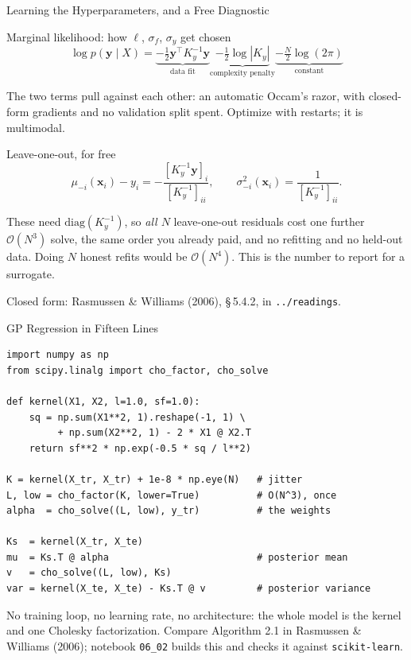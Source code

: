 \documentclass[aspectratio=169,11pt]{beamer}
\newcommand{\emphc}[1]{\textcolor{harvardcrimson}{#1}}
\newcommand{\x}{\bm{x}}
\begin{document}
\begin{frame}{Learning the Hyperparameters, and a Free Diagnostic}
\small
\begin{block}{Marginal likelihood: how $\ell$, $\sigma_f$, $\sigma_y$ get chosen}
\vspace{-6pt}
\[
\log p(\bm y \mid X) =
\underbrace{-\tfrac{1}{2}\bm y^\top K_y^{-1} \bm y}_{\text{data fit}}
\underbrace{-\tfrac{1}{2}\log|K_y|}_{\text{complexity penalty}}
\underbrace{-\tfrac{N}{2}\log(2\pi)}_{\text{constant}}
\]
\vspace{-8pt}

The two terms pull against each other: \emphc{an automatic Occam's razor}, with closed-form gradients and no validation split spent. Optimize with restarts; it is multimodal.
\end{block}

\vspace{0.08cm}
\begin{block}{Leave-one-out, for free}
\vspace{-6pt}
\[
\mu_{-i}(\x_i) - y_i = -\frac{[K_y^{-1}\bm y]_i}{[K_y^{-1}]_{ii}},
\qquad
\sigma^2_{-i}(\x_i) = \frac{1}{[K_y^{-1}]_{ii}} .
\]
\vspace{-8pt}

These need $\mathrm{diag}(K_y^{-1})$, so \emph{all $N$} leave-one-out residuals cost one further $\mathcal{O}(N^3)$ solve, the same order you already paid, and \emphc{no refitting and no held-out data}. Doing $N$ honest refits would be $\mathcal{O}(N^4)$. \emphc{This is the number to report for a surrogate.}
\end{block}

\vspace{0.1cm}
{\footnotesize Closed form: Rasmussen \& Williams (2006), \S\,5.4.2, in \texttt{../readings}.}
\end{frame}

\begin{frame}[fragile]{GP Regression in Fifteen Lines}
\begin{lstlisting}[basicstyle=\scriptsize\ttfamily]
import numpy as np
from scipy.linalg import cho_factor, cho_solve

def kernel(X1, X2, l=1.0, sf=1.0):
    sq = np.sum(X1**2, 1).reshape(-1, 1) \
         + np.sum(X2**2, 1) - 2 * X1 @ X2.T
    return sf**2 * np.exp(-0.5 * sq / l**2)

K = kernel(X_tr, X_tr) + 1e-8 * np.eye(N)   # jitter
L, low = cho_factor(K, lower=True)          # O(N^3), once
alpha  = cho_solve((L, low), y_tr)          # the weights

Ks  = kernel(X_tr, X_te)
mu  = Ks.T @ alpha                          # posterior mean
v   = cho_solve((L, low), Ks)
var = kernel(X_te, X_te) - Ks.T @ v         # posterior variance
\end{lstlisting}

\vspace{0.1cm}
{\footnotesize No training loop, no learning rate, no architecture: the whole model is the kernel and one Cholesky factorization. Compare Algorithm 2.1 in Rasmussen \& Williams (2006); notebook \texttt{06\_02} builds this and checks it against \texttt{scikit-learn}.}
\end{frame}
\end{document}
